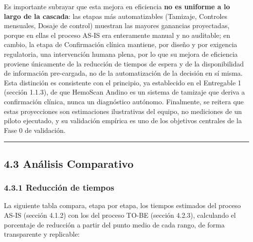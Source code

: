 \documentclass[11pt,a4paper]{article}
\begin{document}
Es importante subrayar que esta mejora en eficiencia \textbf{no es uniforme a lo largo de la cascada}: las etapas más automatizables (Tamizaje, Controles mensuales, Dosaje de control) muestran las mayores ganancias proyectadas, porque en ellas el proceso AS-IS era enteramente manual y no auditable; en cambio, la etapa de Confirmación clínica mantiene, por diseño y por exigencia regulatoria, una intervención humana plena, por lo que su mejora de eficiencia proviene únicamente de la reducción de tiempos de espera y de la disponibilidad de información pre-cargada, no de la automatización de la decisión en sí misma. Esta distinción es consistente con el principio, ya establecido en el Entregable 1 (sección 1.1.3), de que HemoScan Andino es un sistema de tamizaje que deriva a confirmación clínica, nunca un diagnóstico autónomo. Finalmente, se reitera que estas proyecciones son estimaciones ilustrativas del equipo, no mediciones de un piloto ejecutado, y su validación empírica es uno de los objetivos centrales de la Fase 0 de validación.

\begin{center}\rule{0.5\linewidth}{0.5pt}\end{center}

\subsection{4.3 Análisis Comparativo}\label{anuxe1lisis-comparativo}

\subsubsection{4.3.1 Reducción de tiempos}\label{reducciuxf3n-de-tiempos}

La siguiente tabla compara, etapa por etapa, los tiempos estimados del proceso AS-IS (sección 4.1.2) con los del proceso TO-BE (sección 4.2.3), calculando el porcentaje de reducción a partir del punto medio de cada rango, de forma transparente y replicable:
\end{document}
